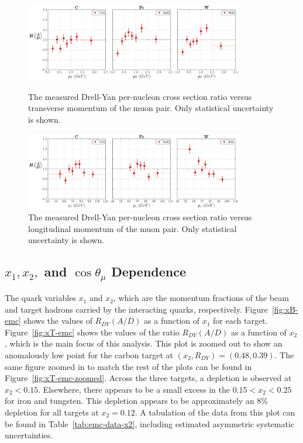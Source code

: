 \begin{figure}
	\centering
	\includegraphics[width=0.85\textwidth]{figures/results/pT-emc.png}
	\caption{The measured Drell-Yan per-nucleon cross section ratio versus transverse momentum of the muon pair. Only statistical uncertainty is shown.}
	\label{fig:pt-emc}
	\vspace{1cm}
	\includegraphics[width=0.85\textwidth]{figures/results/pz-emc.png}
	\caption{The measured Drell-Yan per-nucleon cross section ratio versus longitudinal momentum of the muon pair. Only statistical uncertainty is shown.}
	\label{fig:pz-emc}
\end{figure}

\subsection{$x_1, x_2,$ and $\cos\theta_\mu$ Dependence}

The quark variables $x_1$ and $x_2$, which are the momentum fractions of the beam and target hadrons carried by the interacting quarks, respectively. Figure~\ref{fig:xB-emc} shows the values of $R_{DY}(A/D)$ as a function of $x_1$ for each target. Figure~\ref{fig:xT-emc} shows the values of the ratio $R_{DY}(A/D)$ as a function of $x_2$, which is the main focus of this analysis. This plot is zoomed out to show an anomalously low point for the carbon target at $(x_2, R_{DY})=(0.48, 0.39)$. The same figure zoomed in to match the rest of the plots can be found in Figure~\ref{fig:xT-emc-zoomed}. Across the three targets, a depletion is observed at $x_2<0.15$. Elsewhere, there appears to be a small excess in the $0.15<x_2<0.25$ for iron and tungsten. This depletion appears to be approximately an 8\% depletion for all targets at $x_2=0.12$. A tabulation of the data from this plot can be found in Table~\ref{tab:emc-data-x2}, including estimated asymmetric systematic uncertainties.

